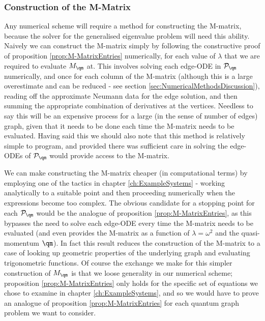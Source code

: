 \subsubsection{Construction of the M-Matrix} \label{sec:ConcFutureConstructM}
Any numerical scheme will require a method for constructing the M-matrix, because the solver for the generalised eigenvalue problem will need this ability.
Naively we can construct the M-matrix simply by following the constructive proof of proposition \ref{prop:M-MatrixEntries} numerically, for each value of $\lambda$ that we are required to evaluate $M_{\qm}$ at.
This involves solving each edge-ODE in $\mathcal{P}_{\qm}$ numerically, and once for each column of the M-matrix (although this is a large overestimate and can be reduced - see section \ref{sec:NumericalMethodsDiscussion}), reading off the approximate Neumann data for the edge solution, and then summing the appropriate combination of derivatives at the vertices.
Needless to say this will be an expensive process for a large (in the sense of number of edges) graph, given that it needs to be done each time the M-matrix needs to be evaluated.
Having said this we should also note that this method is relatively simple to program, and provided there was sufficient care in solving the edge-ODEs of $\mathcal{P}_{\qm}$ would provide access to the M-matrix. \newline

We can make constructing the M-matrix cheaper (in computational terms) by employing one of the tactics in chapter \ref{ch:ExampleSystems} - working analytically to a suitable point and then proceeding numerically when the expressions become too complex.
The obvious candidate for a stopping point for each $\mathcal{P}_{\qm}$ would be the analogue of proposition \ref{prop:M-MatrixEntries}, as this bypasses the need to solve each edge-ODE every time the M-matrix needs to be evaluated (and even provides the M-matrix as a function of $\lambda=\omega^2$ and the quasi-momentum $\qm$).
In fact this result reduces the construction of the M-matrix to a case of looking up geometric properties of the underlying graph and evaluating trigonometric functions.
Of course the exchange we make for this simpler construction of $M_{\qm}$ is that we loose generality in our numerical scheme; proposition \ref{prop:M-MatrixEntries} only holds for the specific set of equations we chose to examine in chapter \ref{ch:ExampleSystems}, and so we would have to prove an analogue of proposition \ref{prop:M-MatrixEntries} for each quantum graph problem we want to consider. \newline

